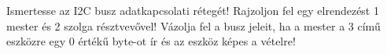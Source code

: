 \begin{example}

Ismertesse az I2C busz adatkapcsolati rétegét! Rajzoljon fel egy elrendezést 1 mester és 2 szolga résztvevővel! Vázolja fel a busz jeleit, ha a mester a 3 című eszközre egy 0 értékű byte-ot ír és az eszköz képes a vételre!


\tcbline
\vspace{1mm}

\solution

\end{example}